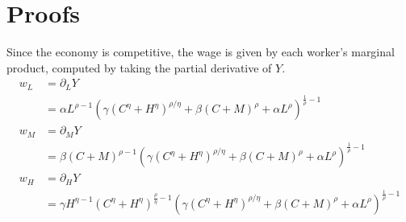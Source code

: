 \chapter{Proofs}

Since the economy is competitive, the wage is given by each worker's marginal product, computed by taking the partial derivative of $Y$.
\begin{align*}
w_L &= \partial_LY \\
    &= \alpha  L^{\rho -1} \left(\gamma  \left(C^{\eta }+H^{\eta }\right)^{\rho /\eta }+\beta  (C+M)^{\rho }+\alpha  L^{\rho }\right)^{\frac{1}{\rho }-1} \\
w_M &= \partial_MY \\
    &= \beta  (C+M)^{\rho -1} \left(\gamma  \left(C^{\eta }+H^{\eta }\right)^{\rho /\eta }+\beta  (C+M)^{\rho }+\alpha  L^{\rho }\right)^{\frac{1}{\rho }-1} \\
w_H &= \partial_HY \\
    &= \gamma  H^{\eta -1} \left(C^{\eta }+H^{\eta }\right)^{\frac{\rho }{\eta }-1} \left(\gamma  \left(C^{\eta }+H^{\eta }\right)^{\rho /\eta }+\beta  (C+M)^{\rho }+\alpha  L^{\rho }\right)^{\frac{1}{\rho }-1}
\end{align*}

